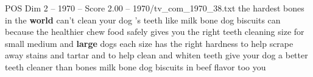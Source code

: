 \begin{textsample}{POS Dim 2 – 1970 – Score 2.00 – 1970/tv\_com\_1970\_38.txt}  \label{ex:f2_pos_054}
the hardest bones in the \textbf{world} can't clean your dog 's teeth like milk bone dog biscuits can because the healthier chew food safely gives you the right teeth cleaning size for small medium and \textbf{large} dogs each size has the right hardness to help scrape away stains and tartar and to help clean and whiten teeth give your dog a better teeth cleaner than bones milk bone dog biscuits in beef flavor too you

\end{textsample}
